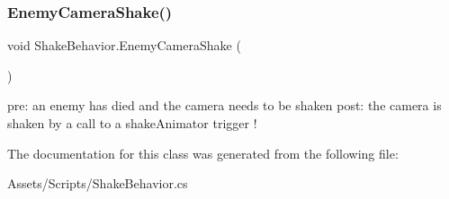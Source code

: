 \subsubsection{\texorpdfstring{EnemyCameraShake()}{EnemyCameraShake()}}
{\footnotesize\ttfamily void Shake\+Behavior.\+Enemy\+Camera\+Shake (\begin{DoxyParamCaption}{ }\end{DoxyParamCaption})}

pre\+: an enemy has died and the camera needs to be shaken post\+: the camera is shaken by a call to a shake\+Animator trigger ! 

The documentation for this class was generated from the following file\+:\begin{DoxyCompactItemize}
\item 
Assets/\+Scripts/Shake\+Behavior.\+cs\end{DoxyCompactItemize}
